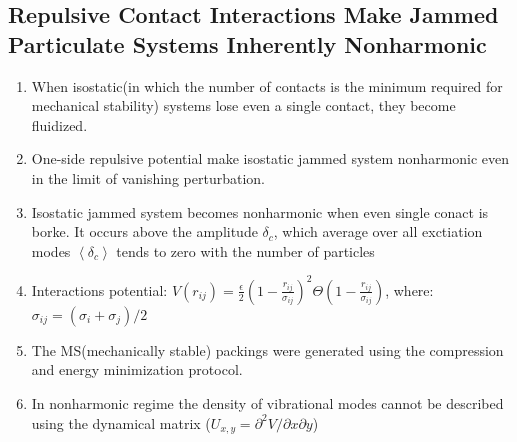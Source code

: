 \documentclass[10pt,a4paper]{article}
\begin{document}
\subsection{Repulsive Contact Interactions Make Jammed Particulate Systems Inherently Nonharmonic\cite{schreck:11}}
\begin{enumerate}
 \item When isostatic(in which the number of contacts is the minimum required for mechanical stability) systems lose even a single contact, they become fluidized.
 \item One-side repulsive potential make isostatic jammed system nonharmonic even in the limit of vanishing perturbation.
 \item Isostatic jammed system becomes nonharmonic when even single conact is borke. It occurs above the amplitude $\delta_c$, which average over all exctiation modes $\left<\delta_c\right>$ tends to zero with the number of particles
 \item Interactions potential: $V(r_{ij}) = \frac{\epsilon}{2} \left( 1 - \frac{r_{ij}}{\sigma_{ij}} \right)^2 \Theta\left( 1 - \frac{r_{ij}}{\sigma_{ij}} \right)$, where: $\sigma_{ij} = (\sigma_i + \sigma_j)/2$
 \item The MS(mechanically stable) packings were generated using the compression and energy minimization protocol.
 \item In nonharmonic regime the density of vibrational modes cannot be described using the dynamical matrix ($U_{x,y} = \partial^2 V / \partial x\partial y$)
\end{enumerate}
\end{document}
